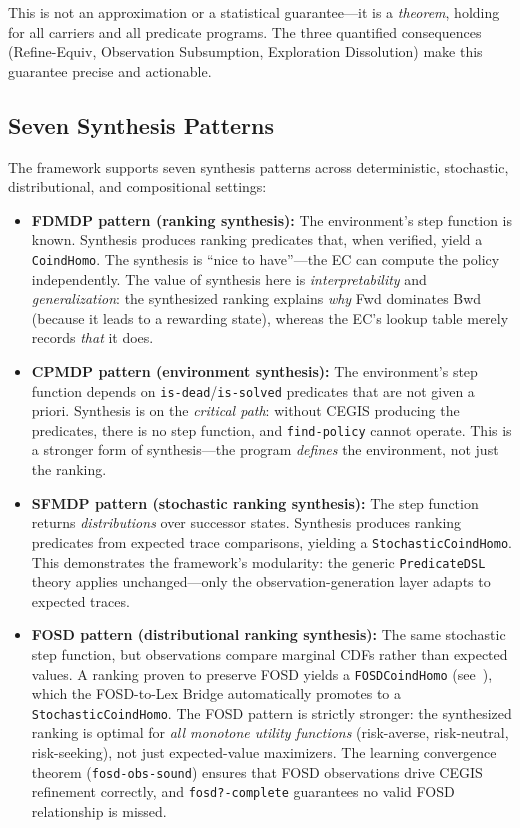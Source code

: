 \documentclass[9pt,a4paper]{article}
\theoremstyle{plain}
\theoremstyle{definition}
\theoremstyle{remark}
\begin{document}
This is not an approximation or a statistical guarantee---it is a \emph{theorem}, holding for all carriers and all predicate programs.  The three quantified consequences (Refine-Equiv, Observation Subsumption, Exploration Dissolution) make this guarantee precise and actionable.

\subsection{Seven Synthesis Patterns}

The framework supports seven synthesis patterns across deterministic, stochastic, distributional, and compositional settings:

\begin{itemize}
\item \textbf{FDMDP pattern (ranking synthesis):} The environment's step function is known.  Synthesis produces ranking predicates that, when verified, yield a \texttt{CoindHomo}.  The synthesis is ``nice to have''---the EC can compute the policy independently.  The value of synthesis here is \emph{interpretability} and \emph{generalization}: the synthesized ranking explains \emph{why} Fwd dominates Bwd (because it leads to a rewarding state), whereas the EC's lookup table merely records \emph{that} it does.

\item \textbf{CPMDP pattern (environment synthesis):} The environment's step function depends on \texttt{is-dead}/\texttt{is-solved} predicates that are not given a priori.  Synthesis is on the \emph{critical path}: without CEGIS producing the predicates, there is no step function, and \texttt{find-policy} cannot operate.  This is a stronger form of synthesis---the program \emph{defines} the environment, not just the ranking.

\item \textbf{SFMDP pattern (stochastic ranking synthesis):} The step function returns \emph{distributions} over successor states.  Synthesis produces ranking predicates from expected trace comparisons, yielding a \texttt{StochasticCoindHomo}.  This demonstrates the framework's modularity: the generic \texttt{PredicateDSL} theory applies unchanged---only the observation-generation layer adapts to expected traces.

\item \textbf{FOSD pattern (distributional ranking synthesis):} The same stochastic step function, but observations compare marginal CDFs rather than expected values.  A ranking proven to preserve FOSD yields a \texttt{FOSDCoindHomo} (see~\cite{CSHRLSuccessor}), which the FOSD-to-Lex Bridge automatically promotes to a \texttt{StochasticCoindHomo}.  The FOSD pattern is strictly stronger: the synthesized ranking is optimal for \emph{all monotone utility functions} (risk-averse, risk-neutral, risk-seeking), not just expected-value maximizers.  The learning convergence theorem (\texttt{fosd-obs-sound}) ensures that FOSD observations drive CEGIS refinement correctly, and \texttt{fosd?-complete} guarantees no valid FOSD relationship is missed.


\end{itemize}
\end{document}

